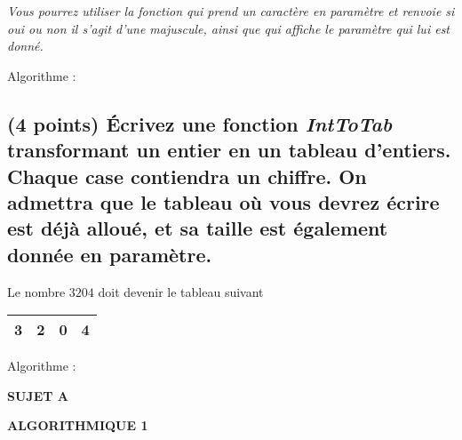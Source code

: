 \documentclass[11pt,a4paper]{article}
\newcommand{\TitreMatiere}{Algorithmique 1}
\begin{document}

\noindent \textit{Vous pourrez utiliser la fonction  qui prend un caractère en paramètre et renvoie si oui ou non il s'agit d'une majuscule, ainsi que  qui affiche le paramètre qui lui est donné.}

\begin{center}
Algorithme :
\end{center}


\clearpage


\subsection{(4 points) \'Ecrivez une fonction \og \textit{IntToTab} \fg{} transformant un entier en un tableau d'entiers. Chaque case contiendra un chiffre. On admettra que le tableau où vous devrez écrire est déjà alloué, et sa taille est également donnée en paramètre. }


\begin{center}
  Le nombre $ 3204 $ doit devenir le tableau suivant

  \smallskip

  \begin{tabular}{| c | c | c | c |}
    \hline
    3 & 2 & 0 & 4 \\
    \hline
  \end{tabular}
\end{center}


\begin{center}
Algorithme :
\end{center}


\clearpage




\vfillFirst

\begin{center}

\begin{LARGE}
\textbf{SUJET A}

\bigskip

\textbf{\MakeUppercase{\TitreMatiere}}
\end{LARGE}

\end{center}

\vfillLast
\end{document}

